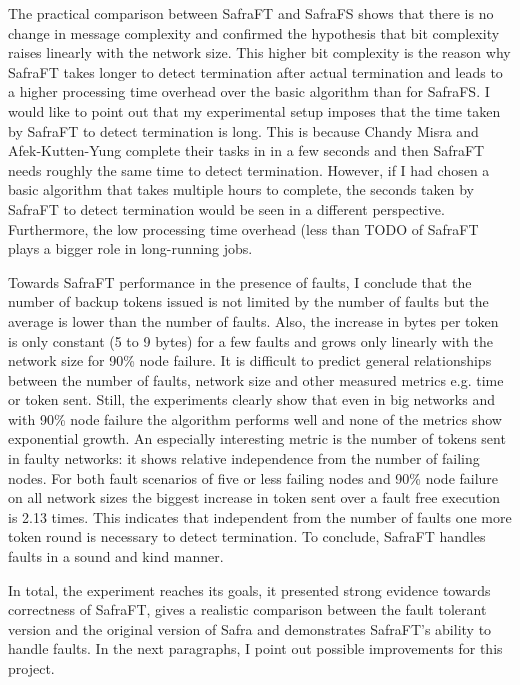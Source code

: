 The practical comparison between SafraFT and SafraFS shows that there is no change in message complexity and confirmed the hypothesis that bit complexity raises linearly with the network size. 
This higher bit complexity is the reason why SafraFT takes longer to detect termination after actual termination and leads to a higher processing time overhead over the basic algorithm than for SafraFS.
I would like to point out that my experimental setup imposes that the time taken by SafraFT to detect termination is long.
This is because Chandy Misra and Afek-Kutten-Yung complete their tasks in in a few seconds and then SafraFT needs roughly the same time to detect termination.
However, if I had chosen a basic algorithm that takes multiple hours to complete, the seconds taken by SafraFT to detect termination would be seen in a different perspective.
Furthermore, the low processing time overhead (less than TODO%
of SafraFT plays a bigger role in long-running jobs.

Towards SafraFT performance in the presence of faults, I conclude that the number of backup tokens issued is not limited by the number of faults but the average is lower than the number of faults.
Also, the increase in bytes per token is only constant (5 to 9 bytes) for a few faults and grows only linearly with the network size for 90\% node failure.  %
It is difficult to predict general relationships between the number of faults, network size and other measured metrics e.g. time or token sent.  
Still, the experiments clearly show that even in big networks and with 90\% node failure the algorithm performs well and none of the metrics show exponential growth.
An especially interesting metric is the number of tokens sent in faulty networks: it shows relative independence from the number of failing nodes.
For both fault scenarios of five or less failing nodes and 90\% node failure on all network sizes the biggest increase in token sent over a fault free execution is 2.13 times. %
This indicates that independent from the number of faults one more token round is necessary to detect termination.
To conclude, SafraFT handles faults in a sound and kind manner.

In total, the experiment reaches its goals, it presented strong evidence towards correctness of SafraFT, gives a realistic comparison between the fault tolerant version and the original version of Safra and demonstrates SafraFT's ability to handle faults.
In the next paragraphs, I point out possible improvements for this project.

